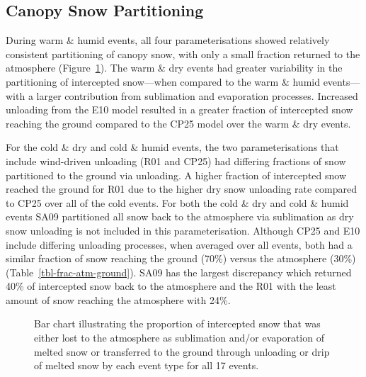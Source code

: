 \documentclass[
  letterpaper,
]{tex/uofsthesis-cs}
\begin{document}
\subsection{Canopy Snow Partitioning}\label{canopy-snow-partitioning}

During warm \& humid events, all four parameterisations showed
relatively consistent partitioning of canopy snow, with only a small
fraction returned to the atmosphere (Figure~\ref{fig-partitioning}). The
warm \& dry events had greater variability in the partitioning of
intercepted snow---when compared to the warm \& humid events---with a
larger contribution from sublimation and evaporation processes.
Increased unloading from the E10 model resulted in a greater fraction of
intercepted snow reaching the ground compared to the CP25 model over the
warm \& dry events.

For the cold \& dry and cold \& humid events, the two parameterisations
that include wind-driven unloading (R01 and CP25) had differing
fractions of snow partitioned to the ground via unloading. A higher
fraction of intercepted snow reached the ground for R01 due to the
higher dry snow unloading rate compared to CP25 over all of the cold
events. For both the cold \& dry and cold \& humid events SA09
partitioned all snow back to the atmosphere via sublimation as dry snow
unloading is not included in this parameterisation. Although CP25 and
E10 include differing unloading processes, when averaged over all
events, both had a similar fraction of snow reaching the ground (70\%)
versus the atmosphere (30\%) (Table~\ref{tbl-frac-atm-ground}). SA09 has
the largest discrepancy which returned 40\% of intercepted snow back to
the atmosphere and the R01 with the least amount of snow reaching the
atmosphere with 24\%.

\begin{figure}


\caption{\label{fig-partitioning}Bar chart illustrating the proportion
of intercepted snow that was either lost to the atmosphere as
sublimation and/or evaporation of melted snow or transferred to the
ground through unloading or drip of melted snow by each event type for
all 17 events.}

\end{figure}%
\end{document}
